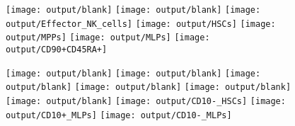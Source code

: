 \documentclass[11pt]{article}
\begin{document}
\begin{figure}[htbp]
\begin{minipage}[t]{0.125\textwidth}
    \texttt{[image: output/blank]}
    \texttt{[image: output/blank]}
    \texttt{[image: output/Effector\_NK\_cells]}
    \texttt{[image: output/HSCs]}
    \texttt{[image: output/MPPs]}
    \texttt{[image: output/MLPs]}
    \texttt{[image: output/CD90+CD45RA+]}
  \end{minipage}%
  \begin{minipage}[t]{0.125\textwidth}
    \centering
    \vspace{-0.333\linewidth} %
    \texttt{[image: output/blank]}
    \texttt{[image: output/blank]}
    \texttt{[image: output/blank]}
    \texttt{[image: output/blank]}
    \texttt{[image: output/blank]}
    \texttt{[image: output/blank]}
    \texttt{[image: output/CD10-\_HSCs]}
    \texttt{[image: output/CD10+\_MLPs]}
    \texttt{[image: output/CD10-\_MLPs]}
  \end{minipage}%
  \label{fig:figure}
\end{figure}
\end{document}
